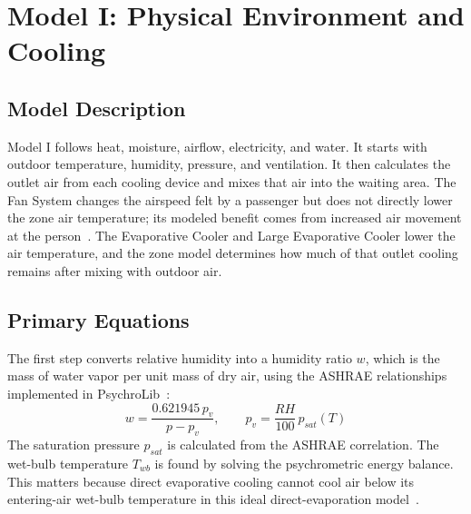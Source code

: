 \section{Model I: Physical Environment and Cooling}
 
\subsection{Model Description}
 
Model I follows heat, moisture, airflow, electricity, and water. It starts with outdoor temperature, humidity, pressure, and ventilation. It then calculates the outlet air from each cooling device and mixes that air into the waiting area. The Fan System changes the airspeed felt by a passenger but does not directly lower the zone air temperature; its modeled benefit comes from increased air movement at the person~\cite{cbe_fans_2023}. The Evaporative Cooler and Large Evaporative Cooler lower the air temperature, and the zone model determines how much of that outlet cooling remains after mixing with outdoor air.
 
\subsection{Primary Equations}
 
The first step converts relative humidity into a humidity ratio $w$, which is the mass of water vapor per unit mass of dry air, using the ASHRAE relationships implemented in PsychroLib~\cite{psychrolib_volume}:
\begin{equation}
w = \frac{0.621945\, p_v}{p - p_v}, \qquad p_v = \frac{RH}{100}\, p_{sat}(T)
\end{equation}
The saturation pressure $p_{sat}$ is calculated from the ASHRAE correlation. The wet-bulb temperature $T_{wb}$ is found by solving the psychrometric energy balance. This matters because direct evaporative cooling cannot cool air below its entering-air wet-bulb temperature in this ideal direct-evaporation model~\cite{pnnl_evaporative}.
 
